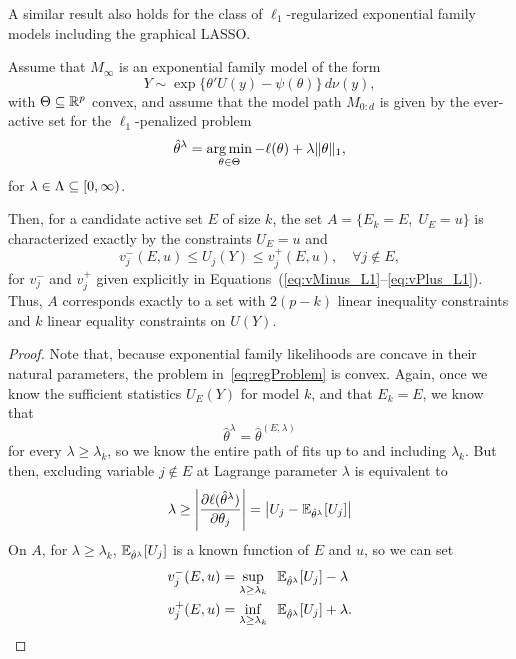 \documentclass{article}
\begin{document}
A similar result also holds for the class of $\ell_1$-regularized exponential family models including the graphical LASSO.

\begin{theorem}
  Assume that $M_\infty$ is an exponential family model
  of the form
  \[
  Y \sim \exp\{ \theta'U(y) - \psi(\theta) \}\,d\nu(y),
  \]
  with $\Theta \subseteq \mathbb{R}^p$ convex, and assume
  that the model path $M_{0:d}$ is given 
  by the ever-active set for the $\ell_1$-penalized problem
  \begin{equation}\label{eq:regProblem}
  \hat\theta^\lambda = \operatorname*{arg\,min}_{\theta\in \Theta} 
  -\ell(\theta) + \lambda\|\theta\|_1,
  \end{equation}
  for $\lambda\in \Lambda \subseteq [0,\infty)$.

  Then, for a candidate active set $E$ of size $k$, 
  the set $A = \{E_k = E, \;U_E = u\}$ is characterized 
  exactly by the constraints $U_E = u$ and
  \[
  v_j^-(E,u) \leq U_j(Y) \leq v_j^+(E,u), \quad\forall j \notin E,
  \]
  for $v_j^-$ and $v_j^+$ given explicitly in
  Equations~(\ref{eq:vMinus_L1}--\ref{eq:vPlus_L1}).
  Thus, $A$ corresponds exactly to 
  a set with $2(p-k)$ linear inequality constraints and $k$
  linear equality constraints on $U(Y)$.
\end{theorem}


\begin{proof}
  Note that, because exponential family likelihoods are concave in their natural parameters, the problem in~\eqref{eq:regProblem} is convex. Again, once we know the sufficient statistics $U_E(Y)$ for model $k$, and that $E_k=E$, we know that
  \[
  \hat\theta^\lambda = \hat\theta^{(E,\lambda)}
  \]
  for every $\lambda \geq \lambda_k$, so we know the entire path of fits up to and including $\lambda_k$. But then, excluding variable $j \notin E$ at Lagrange parameter $\lambda$ is equivalent to
  \[
  \lambda \geq 
  \left| \frac{\partial \ell(\hat\theta^\lambda)}{\partial \theta_j} \right|
  = \left|U_j - \mathbb{E}_{\hat\theta^\lambda}[U_j]\right|
  \]
  On $A$, for $\lambda \geq\lambda_k$, 
  $\mathbb{E}_{\hat\theta^\lambda}[U_j]$ is a known function of $E$ and $u$,
  so we can set
  \begin{align}\label{eq:vMinus_L1}
    v_j^-(E,u) &= \sup_{\lambda \geq \lambda_k} \;\; 
    \mathbb{E}_{\hat\theta^\lambda}[U_j] - \lambda \\
    \label{eq:vPlus_L1}
    v_j^+(E,u) &= \inf_{\lambda \geq \lambda_k} \;\;
    \mathbb{E}_{\hat\theta^\lambda}[U_j] + \lambda .
  \end{align}
\end{proof}
\end{document}
